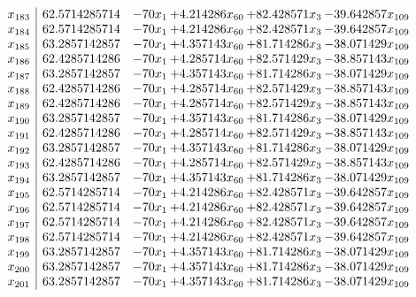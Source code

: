 \documentclass[11pt]{article}
\begin{document}
\[\begin{array}{c| c c@{\hskip 2pt} c@{\hskip 2pt} c@{\hskip 2pt} c@{\hskip 2pt} }
 x_{183}   &  62.5714285714 & -70 x_{1} & + 4.214286 x_{60} & + 82.428571 x_{3} & -39.642857 x_{109}\\
 x_{184}   &  62.5714285714 & -70 x_{1} & + 4.214286 x_{60} & + 82.428571 x_{3} & -39.642857 x_{109}\\
 x_{185}   &  63.2857142857 & -70 x_{1} & + 4.357143 x_{60} & + 81.714286 x_{3} & -38.071429 x_{109}\\
 x_{186}   &  62.4285714286 & -70 x_{1} & + 4.285714 x_{60} & + 82.571429 x_{3} & -38.857143 x_{109}\\
 x_{187}   &  63.2857142857 & -70 x_{1} & + 4.357143 x_{60} & + 81.714286 x_{3} & -38.071429 x_{109}\\
 x_{188}   &  62.4285714286 & -70 x_{1} & + 4.285714 x_{60} & + 82.571429 x_{3} & -38.857143 x_{109}\\
 x_{189}   &  62.4285714286 & -70 x_{1} & + 4.285714 x_{60} & + 82.571429 x_{3} & -38.857143 x_{109}\\
 x_{190}   &  63.2857142857 & -70 x_{1} & + 4.357143 x_{60} & + 81.714286 x_{3} & -38.071429 x_{109}\\
 x_{191}   &  62.4285714286 & -70 x_{1} & + 4.285714 x_{60} & + 82.571429 x_{3} & -38.857143 x_{109}\\
 x_{192}   &  63.2857142857 & -70 x_{1} & + 4.357143 x_{60} & + 81.714286 x_{3} & -38.071429 x_{109}\\
 x_{193}   &  62.4285714286 & -70 x_{1} & + 4.285714 x_{60} & + 82.571429 x_{3} & -38.857143 x_{109}\\
 x_{194}   &  63.2857142857 & -70 x_{1} & + 4.357143 x_{60} & + 81.714286 x_{3} & -38.071429 x_{109}\\
 x_{195}   &  62.5714285714 & -70 x_{1} & + 4.214286 x_{60} & + 82.428571 x_{3} & -39.642857 x_{109}\\
 x_{196}   &  62.5714285714 & -70 x_{1} & + 4.214286 x_{60} & + 82.428571 x_{3} & -39.642857 x_{109}\\
 x_{197}   &  62.5714285714 & -70 x_{1} & + 4.214286 x_{60} & + 82.428571 x_{3} & -39.642857 x_{109}\\
 x_{198}   &  62.5714285714 & -70 x_{1} & + 4.214286 x_{60} & + 82.428571 x_{3} & -39.642857 x_{109}\\
 x_{199}   &  63.2857142857 & -70 x_{1} & + 4.357143 x_{60} & + 81.714286 x_{3} & -38.071429 x_{109}\\
 x_{200}   &  63.2857142857 & -70 x_{1} & + 4.357143 x_{60} & + 81.714286 x_{3} & -38.071429 x_{109}\\
 x_{201}   &  63.2857142857 & -70 x_{1} & + 4.357143 x_{60} & + 81.714286 x_{3} & -38.071429 x_{109}\\

\end{array}\]
\end{document}
